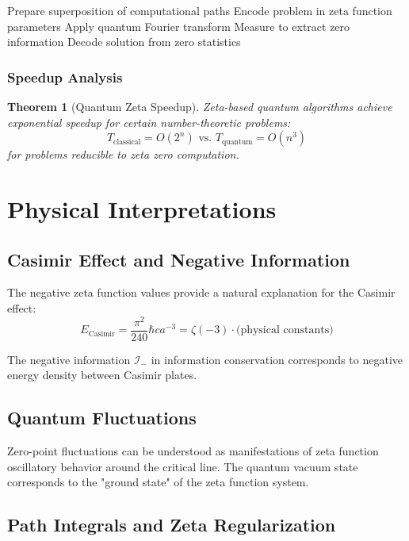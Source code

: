 \documentclass[12pt]{article}
\theoremstyle{plain}
\newtheorem{theorem}{Theorem}[section]
\theoremstyle{definition}
\newcommand{\cI}{\mathcal{I}}
\begin{document}
\begin{algorithm}
\caption{Quantum Zeta Algorithm}
\begin{algorithmic}
\STATE Prepare superposition of computational paths
\STATE Encode problem in zeta function parameters
\STATE Apply quantum Fourier transform
\STATE Measure to extract zero information
\STATE Decode solution from zero statistics
\end{algorithmic}
\end{algorithm}

\subsubsection{Speedup Analysis}

\begin{theorem}[Quantum Zeta Speedup]
Zeta-based quantum algorithms achieve exponential speedup for certain number-theoretic problems:
$$T_{\text{classical}} = O(2^n) \text{ vs. } T_{\text{quantum}} = O(n^3)$$
for problems reducible to zeta zero computation.
\end{theorem}

\section{Physical Interpretations}

\subsection{Casimir Effect and Negative Information}

The negative zeta function values provide a natural explanation for the Casimir effect:
$$E_{\text{Casimir}} = \frac{\pi^2}{240} \hbar c a^{-3} = \zeta(-3) \cdot \text{(physical constants)}$$

The negative information $\cI_-$ in information conservation corresponds to negative energy density between Casimir plates.

\subsection{Quantum Fluctuations}

Zero-point fluctuations can be understood as manifestations of zeta function oscillatory behavior around the critical line. The quantum vacuum state corresponds to the "ground state" of the zeta function system.

\subsection{Path Integrals and Zeta Regularization}
\end{document}
